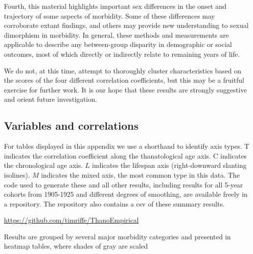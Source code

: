 \documentclass[11pt,oneside]{article} %
\begin{document}
Fourth,
this material highlights important sex differences in the onset and trajectory
of some aspects of morbidity. Some of these differences may
corroborate extant findings, and others may provide new understanding to sexual dimorphism in
morbidity. In general, these methods and measurements are applicable to describe
any between-group disparity in demographic or social outcomes, most of which
directly or indirectly relate to remaining years of life.

We do not, at this time, attempt to thoroughly cluster
characteristics based on the scores of the four different correlation
coefficients, but this may be a fruitful exercise for further work. It is our hope that these results are strongly suggestive and orient
future investigation.

\singlespacing

   
%  

%
\begin{appendices}
\section{Variables and correlations}

\end{appendices}

For tables displayed in this appendix we use a shorthand to identify axis types.
T indicates the correlation coefficient along the thanatological age axis. C
indicates the chronological age axis. $L$ indicates the lifespan axis
(right-downward slanting isolines). $M$ indicates the mixed axis, the
most common type in this data. The code used to generate these and all other
results, including results for all 5-year cohorts from 1905-1925 and different
degrees of smoothing, are available freely in a repository. The repository also
contains a csv of these summary results.

\url{https://github.com/timriffe/ThanoEmpirical}

Results are grouped by several major morbidity categories and presented in
heatmap tables, where shades of gray are scaled

\listoftables

\pagebreak
\end{document}

